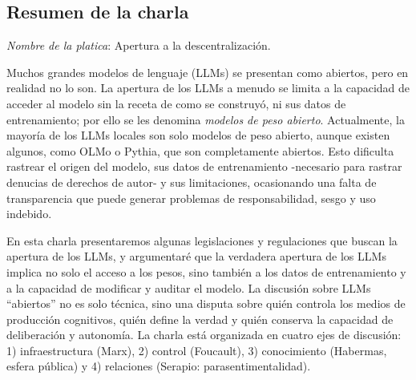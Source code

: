 \subsection{Resumen de la charla}
\textit{Nombre de la platica}: Apertura a la descentralización.
\vspace{1cm} 

Muchos grandes modelos de lenguaje (LLMs) se presentan como abiertos, pero en realidad no lo son.
La apertura de los LLMs a menudo se limita a la capacidad de acceder al modelo sin la receta de como se construyó, ni sus datos
de entrenamiento; por ello se les denomina \textit{modelos de peso abierto}. 
Actualmente, la mayoría de los LLMs locales son solo modelos de peso abierto, aunque existen algunos, como OLMo\cite{groeneveld-etal-2024-olmo} o Pythia\cite{biderman2023pythia}, 
que son completamente abiertos. Esto dificulta rastrear el origen del modelo, sus datos de entrenamiento -necesario para rastrar denucias de derechos de autor- y sus limitaciones, ocasionando una falta de transparencia que puede generar 
problemas de responsabilidad, sesgo y uso indebido.

En esta charla presentaremos algunas legislaciones y regulaciones que buscan la apertura de los LLMs, y argumentaré que la verdadera apertura de los LLMs implica no solo el acceso a los pesos, sino también a los datos de entrenamiento y a la capacidad de modificar y auditar el modelo. La discusión sobre LLMs “abiertos” no es solo técnica, sino una disputa sobre quién controla los medios de producción cognitivos, quién define la verdad y quién conserva la capacidad de deliberación y autonomía. La charla está organizada en cuatro ejes de discusión: 1) infraestructura (Marx), 2) control (Foucault), 3) conocimiento (Habermas, esfera pública) y 4) relaciones (Serapio: parasentimentalidad).